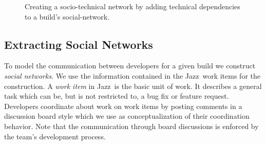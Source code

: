 \begin{figure}[t]
\centering
{}
\quad
{}
\quad
{}
\caption{
Creating a socio-technical network by adding technical dependencies to a build's social-network.}
\label{fig:addtechnicaledge}
\end{figure}





\subsection{Extracting Social Networks}
\label{subsec:social}
To model the communication between developers for a given build we construct \emph{social networks}. 
We use the information contained in the Jazz\texttrademark\ work items for the construction. 
A \emph{work item} in Jazz\texttrademark\ is the basic unit of work. 
It describes a general task which can be, but is not restricted to, a bug fix or feature request.
Developers coordinate about work on work items by posting comments in a discussion board style which we use as conceptualization of their coordination behavior.
Note that the communication through board discussions is enforced by the team's development process. 


